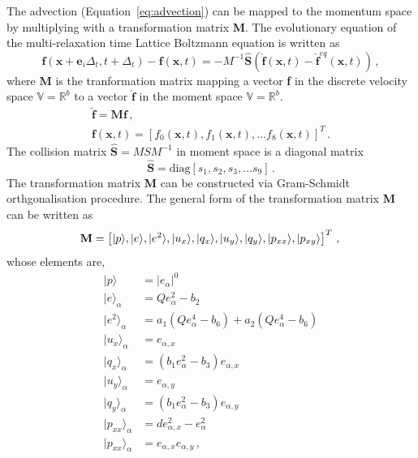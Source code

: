 The advection (Equation~\ref{eq:advection}) can be mapped to the 
momentum space by multiplying with a transformation matrix \textbf{M}. The 
evolutionary equation of the multi-relaxation time Lattice Boltzmann equation 
is written as
%
\begin{equation}
\mathbf{f}(\mathbf{x}+\mathbf{e}_i\Delta_t, t+ 
\Delta_t)-\mathbf{f}(\mathbf{x},t)=-M^{-1}\hat{\mathbf{S}}(\hat{\mathbf{f}}
(\mathbf{x},t)-\hat{\mathbf{f}}^{eq}(\mathbf{x},t))\,,
\end{equation}
%
\noindent where \textbf{M} is the tranformation matrix mapping a vector 
\textbf{f} in the discrete velocity space $\mathds{V}=\mathds{R}^b$ to a vector 
$\hat{\mathbf{f}}$ in the moment space $\mathds{V}=\mathds{R}^b$. 
%
\begin{gather}
\hat{\mathbf{f}}= \mathbf{M}\mathbf{f}\,, \\ 
\mathbf{f}(\mathbf{x},t) =\left[f_0(\mathbf{x},t),f_1(\mathbf{x},t),\dots 
f_8(\mathbf{x},t)\right]^T\,.
\end{gather}
%
The collision matrix $\hat{\mathbf{S}} = MSM^{-1}$ in moment space is 
a diagonal matrix
\begin{equation*}
\hat{\mathbf{S}} =\mbox{diag} \left[ s_1, s_2, s_3, \dots s_9  \right]\,.
\end{equation*} 
%
The transformation matrix \textbf{M} can be constructed via Gram-Schmidt 
orthgonalisation procedure. The general form of the transformation matrix 
\textbf{M} can be written as
%
\begin{equation}
\mathbf{M} =  
\left[|p\rangle,|e\rangle,|e^2\rangle,|u_x\rangle,|q_x\rangle,|u_y\rangle,
|q_y\rangle,|p_{xx}\rangle,|p_{xy}\rangle\right]^T \,, \\
\end{equation}
% 
\noindent whose elements are, 
%
\begin{subequations}
\begin{align}
|p\rangle & =  |\mathit{e}_{\alpha}|^0\\
|e\rangle_{\alpha} & = \mathit{Q}e_{\alpha}^2-b_2\\
|e^2\rangle_{\alpha} & =  	
a_1(\mathit{Q}e_{\alpha}^4-b_6)+a_2(\mathit{Q}e_{\alpha}^4-b_6)\\
|u_x\rangle_{\alpha} & = e_{\alpha,x} \\
|q_x\rangle_{\alpha} & = (\mathit{b}_1e_{\alpha}^2-b_3)e_{\alpha,x}\\
|u_y\rangle_{\alpha} & = e_{\alpha,y}\\
|q_y\rangle_{\alpha} & = (\mathit{b}_1e_{\alpha}^2-b_3)e_{\alpha,y}\\
|p_{xx}\rangle_{\alpha} & = \mathit{d}e_{\alpha,x}^2-e_{\alpha}^2\\
|p_{xx}\rangle_{\alpha}  & = e_{\alpha,x}e_{\alpha,y} \,,
\end{align}
\end{subequations}

